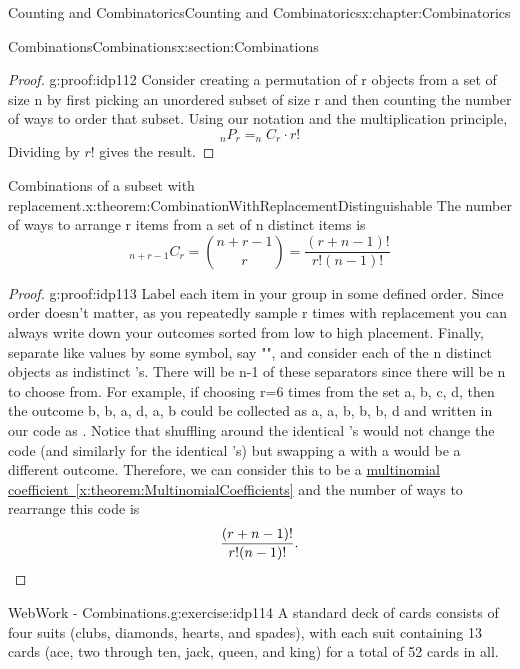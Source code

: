 \documentclass[oneside,10pt,]{book}
\newcommand{\xreffont}{\relax}
\newcommand{\qedhere}{\relax}
\numberwithin{equation}{section}
\begin{document}
\begin{chapterptx}{Counting and Combinatorics}{}{Counting and Combinatorics}{}{}{x:chapter:Combinatorics}
\begin{sectionptx}{Combinations}{}{Combinations}{}{}{x:section:Combinations}
\begin{proof}{}{g:proof:idp112}
Consider creating a permutation of r objects from a set of size n by first picking an unordered subset of size r and then counting the number of ways to order that subset. Using our notation and the multiplication principle,%
\begin{equation*}
_nP_r = _nC_r \cdot r!
\end{equation*}
Dividing by \(r!\) gives the result.%
\end{proof}
\begin{theorem}{Combinations of a subset with replacement.}{}{x:theorem:CombinationWithReplacementDistinguishable}%
The number of ways to arrange r items from a set of n distinct items is%
\begin{equation*}
_{n+r-1}C_r = {{n+r-1} \choose r} = \frac{(r+n-1)!}{r!(n-1)!} 
\end{equation*}
%
\end{theorem}
\begin{proof}{}{g:proof:idp113}
Label each item in your group in some defined order. Since order doesn't matter, as you repeatedly sample r times with replacement you can always write down your outcomes sorted from low to high placement. Finally, separate like values by some symbol, say "\textbar{}", and consider each of the n distinct objects as indistinct \textasteriskcentered{}'s. There will be n-1 of these separators since there will be n to choose from. For example, if choosing r=6 times from the set \textbraceleft{}a, b, c, d\textbraceright{}, then the outcome b, b, a, d, a, b could be collected as a, a, b, b, b, d and written in our code as \textasteriskcentered{}\textasteriskcentered{}\textbar{}\textasteriskcentered{}\textasteriskcentered{}\textasteriskcentered{}\textbar{}\textbar{}\textasteriskcentered{} .  Notice that shuffling around the identical \textasteriskcentered{}'s would not change the code (and similarly for the identical \textbar{}'s) but swapping a \textasteriskcentered{} with a \textbar{} would be a different outcome. Therefore, we can consider this to be a \hyperref[x:theorem:MultinomialCoefficients]{multinomial coefficient~{\xreffont\ref{x:theorem:MultinomialCoefficients}}} and the number of ways to rearrange this code is%
\begin{equation*}
\frac{(r + n-1)!}{r!(n-1)!}.\qedhere
\end{equation*}
%
\end{proof}
\begin{inlineexercise}{WebWork - Combinations.}{g:exercise:idp114}%
A standard deck of cards consists of four suits (clubs, diamonds, hearts, and spades), with each suit containing 13 cards (ace, two through ten, jack, queen, and king) for a total of 52 cards in all.%

\end{inlineexercise}
\end{sectionptx}
\end{chapterptx}
\end{document}
